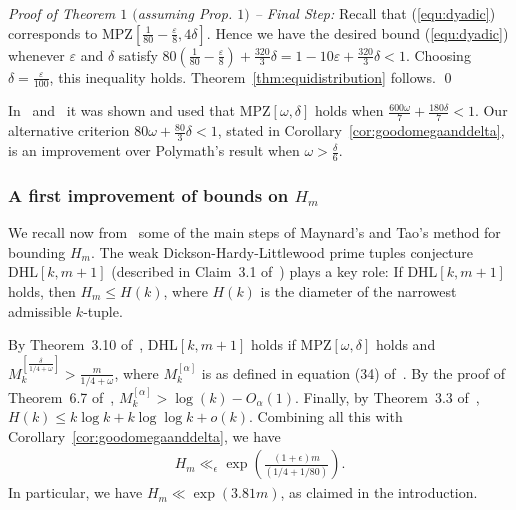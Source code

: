 \documentclass{amsart}
\numberwithin{equation}{section}
\begin{document}
 
 \vspace{3mm}

\emph{Proof of Theorem $1$ $($assuming Prop. $1)$ -- Final Step:} Recall that (\ref{equ:dyadic}) corresponds to $\mbox{MPZ}[\frac{1}{80}-\frac{\varepsilon}{8},4\delta]$. Hence we have the desired bound (\ref{equ:dyadic}) whenever  $\varepsilon$ and $\delta$ satisfy $80(\frac{1}{80}-\frac{\varepsilon}{8}) + \frac{320}{3}\delta = 1 -10\varepsilon + \frac{320}{3}\delta<1$. Choosing $\delta = \frac{\varepsilon}{100}$, this inequality holds. Theorem~\ref{thm:equidistribution} follows. \qed

\vspace{3mm}
 In~\cite{Polymath:2014:EDZ} and~\cite{Polymath:2014:VSS} it was shown and used that $\mbox{MPZ}[\omega,\delta]$ holds when $\frac{600 \omega}{7} + \frac{180 \delta}{7} <1$. Our alternative criterion $80 \omega +\frac{80}{3}\delta <  1$, stated in Corollary~\ref{cor:goodomegaanddelta}, is  an improvement over Polymath's result when $ \omega  >   \frac{\delta}{6}$.
 
 

\subsubsection{A first improvement of bounds on $H_m$} \label{ssec:hb} 
 We recall now from~\cite{Polymath:2014:VSS} some of the main steps of Maynard's and Tao's method for bounding $H_m$. The weak Dickson-Hardy-Littlewood prime tuples conjecture $\mbox{DHL}[k,m+1]$ (described in Claim~3.1 of~\cite{Polymath:2014:VSS}) plays a key role: If $\mbox{DHL}[k,m+1]$ holds, then $H_m \leq H(k)$, where  $H(k)$ is the diameter of the narrowest admissible $k$-tuple.
 
 \vspace{3mm} By Theorem~3.10 of~\cite{Polymath:2014:VSS}, $\mbox{DHL}[k,m+1]$ holds if $\mbox{MPZ}[\omega,\delta]$ holds and $M_k^{[\frac{\delta}{1/4+\omega}]} > \frac{m}{1/4+\omega}$, where $M_k^{[\alpha]}$ is as defined in equation (34) of~\cite{Polymath:2014:VSS}.  By the proof of  Theorem~6.7 of~\cite{Polymath:2014:VSS}, $M_k^{[\alpha]} > \log(k)-O_\alpha(1)$. Finally, by Theorem~3.3 of~\cite{Polymath:2014:VSS},  $H(k) \leq k\log k + k\log\log k +o(k)$. Combining all this with Corollary~\ref{cor:goodomegaanddelta}, we have 
 \begin{align*}
 H_m \ll_\epsilon  \exp\left(\frac{(1+\epsilon)m}{(1/4 + 1/80)} \right).
 \end{align*}
 In particular, we have $H_m \ll \exp(3.81m)$, as claimed in the introduction. 
\end{document}
